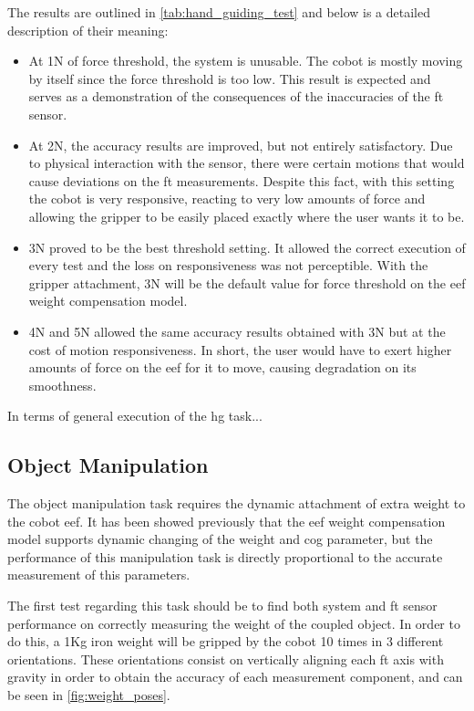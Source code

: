 \par The results are outlined in \autoref{tab:hand_guiding_test} and below is a detailed description of their meaning:
\begin{itemize}
    \item At 1N of force threshold, the system is unusable. The cobot is mostly moving by itself since the force threshold is too low. This result is expected and serves as a demonstration of the consequences of the inaccuracies of the \ac{ft} sensor.
    \item At 2N, the accuracy results are improved, but not entirely satisfactory. Due to physical interaction with the sensor, there were certain motions that would cause deviations on the \ac{ft} measurements. Despite this fact, with this setting the cobot is very responsive, reacting to very low amounts of force and allowing the gripper to be easily placed exactly where the user wants it to be.
    \item 3N proved to be the best threshold setting. It allowed the correct execution of every test and the loss on responsiveness was not perceptible. With the gripper attachment, 3N will be the default value for force threshold on the \ac{eef} weight compensation model.
    \item 4N and 5N allowed the same accuracy results obtained with 3N but at the cost of motion responsiveness. In short, the user would have to exert higher amounts of force on the \ac{eef} for it to move, causing degradation on its smoothness.
\end{itemize}

\par In terms of general execution of the \ac{hg} task...

\subsection{Object Manipulation}

\par The object manipulation task requires the dynamic attachment of extra weight to the cobot \ac{eef}. It has been showed previously that the \ac{eef} weight compensation model supports dynamic changing of the weight and \ac{cog} parameter, but the performance of this manipulation task is directly proportional to the accurate measurement of this parameters.
\par The first test regarding this task should be to find both system and \ac{ft} sensor performance on correctly measuring the weight of the coupled object. In order to do this, a 1Kg iron weight will be gripped by the cobot 10 times in 3 different orientations. These orientations consist on vertically aligning each \ac{ft} axis with gravity in order to obtain the accuracy of each measurement component, and can be seen in \autoref{fig:weight_poses}.


